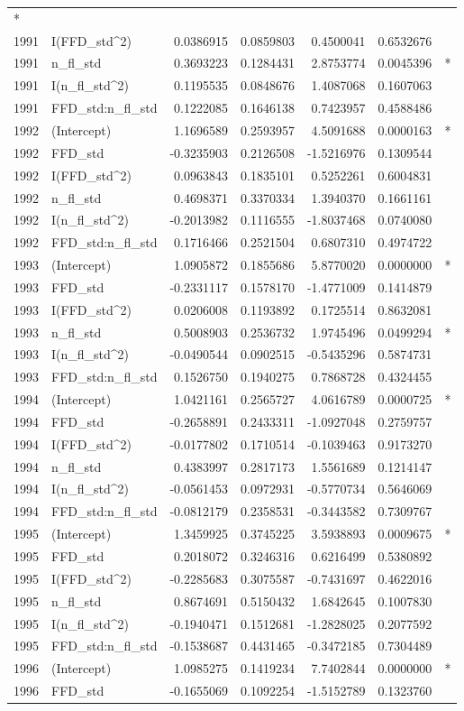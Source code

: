 \documentclass[]{article}
\begin{document}
\begin{longtable}[]{@{}llrrrrl@{}}
*\tabularnewline
1991 & I(FFD\_std\^{}2) & 0.0386915 & 0.0859803 & 0.4500041 & 0.6532676
&\tabularnewline
1991 & n\_fl\_std & 0.3693223 & 0.1284431 & 2.8753774 & 0.0045396 &
*\tabularnewline
1991 & I(n\_fl\_std\^{}2) & 0.1195535 & 0.0848676 & 1.4087068 &
0.1607063 &\tabularnewline
1991 & FFD\_std:n\_fl\_std & 0.1222085 & 0.1646138 & 0.7423957 &
0.4588486 &\tabularnewline
1992 & (Intercept) & 1.1696589 & 0.2593957 & 4.5091688 & 0.0000163 &
*\tabularnewline
1992 & FFD\_std & -0.3235903 & 0.2126508 & -1.5216976 & 0.1309544
&\tabularnewline
1992 & I(FFD\_std\^{}2) & 0.0963843 & 0.1835101 & 0.5252261 & 0.6004831
&\tabularnewline
1992 & n\_fl\_std & 0.4698371 & 0.3370334 & 1.3940370 & 0.1661161
&\tabularnewline
1992 & I(n\_fl\_std\^{}2) & -0.2013982 & 0.1116555 & -1.8037468 &
0.0740080 &\tabularnewline
1992 & FFD\_std:n\_fl\_std & 0.1716466 & 0.2521504 & 0.6807310 &
0.4974722 &\tabularnewline
1993 & (Intercept) & 1.0905872 & 0.1855686 & 5.8770020 & 0.0000000 &
*\tabularnewline
1993 & FFD\_std & -0.2331117 & 0.1578170 & -1.4771009 & 0.1414879
&\tabularnewline
1993 & I(FFD\_std\^{}2) & 0.0206008 & 0.1193892 & 0.1725514 & 0.8632081
&\tabularnewline
1993 & n\_fl\_std & 0.5008903 & 0.2536732 & 1.9745496 & 0.0499294 &
*\tabularnewline
1993 & I(n\_fl\_std\^{}2) & -0.0490544 & 0.0902515 & -0.5435296 &
0.5874731 &\tabularnewline
1993 & FFD\_std:n\_fl\_std & 0.1526750 & 0.1940275 & 0.7868728 &
0.4324455 &\tabularnewline
1994 & (Intercept) & 1.0421161 & 0.2565727 & 4.0616789 & 0.0000725 &
*\tabularnewline
1994 & FFD\_std & -0.2658891 & 0.2433311 & -1.0927048 & 0.2759757
&\tabularnewline
1994 & I(FFD\_std\^{}2) & -0.0177802 & 0.1710514 & -0.1039463 &
0.9173270 &\tabularnewline
1994 & n\_fl\_std & 0.4383997 & 0.2817173 & 1.5561689 & 0.1214147
&\tabularnewline
1994 & I(n\_fl\_std\^{}2) & -0.0561453 & 0.0972931 & -0.5770734 &
0.5646069 &\tabularnewline
1994 & FFD\_std:n\_fl\_std & -0.0812179 & 0.2358531 & -0.3443582 &
0.7309767 &\tabularnewline
1995 & (Intercept) & 1.3459925 & 0.3745225 & 3.5938893 & 0.0009675 &
*\tabularnewline
1995 & FFD\_std & 0.2018072 & 0.3246316 & 0.6216499 & 0.5380892
&\tabularnewline
1995 & I(FFD\_std\^{}2) & -0.2285683 & 0.3075587 & -0.7431697 &
0.4622016 &\tabularnewline
1995 & n\_fl\_std & 0.8674691 & 0.5150432 & 1.6842645 & 0.1007830
&\tabularnewline
1995 & I(n\_fl\_std\^{}2) & -0.1940471 & 0.1512681 & -1.2828025 &
0.2077592 &\tabularnewline
1995 & FFD\_std:n\_fl\_std & -0.1538687 & 0.4431465 & -0.3472185 &
0.7304489 &\tabularnewline
1996 & (Intercept) & 1.0985275 & 0.1419234 & 7.7402844 & 0.0000000 &
*\tabularnewline
1996 & FFD\_std & -0.1655069 & 0.1092254 & -1.5152789 & 0.1323760

\end{longtable}
\end{document}
